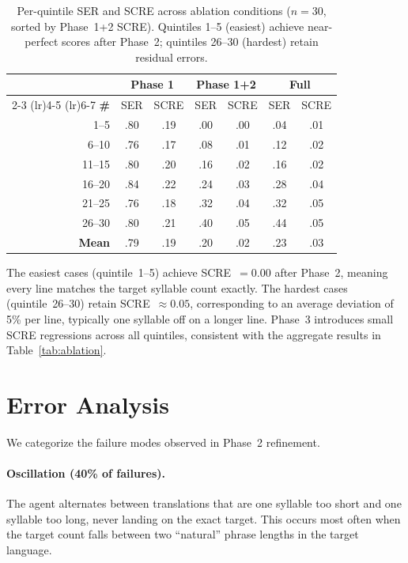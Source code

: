 \documentclass[11pt]{article}
\begin{document}
\begin{table}[h]
\centering
\small
\begin{tabular}{@{}rcccccc@{}}
\toprule
& \multicolumn{2}{c}{\textbf{Phase 1}} & \multicolumn{2}{c}{\textbf{Phase 1+2}} & \multicolumn{2}{c}{\textbf{Full}} \\
\cmidrule(lr){2-3} \cmidrule(lr){4-5} \cmidrule(lr){6-7}
\textbf{\#} & SER & SCRE & SER & SCRE & SER & SCRE \\
\midrule
1--5   & .80 & .19 & .00 & .00 & .04 & .01 \\
6--10  & .76 & .17 & .08 & .01 & .12 & .02 \\
11--15 & .80 & .20 & .16 & .02 & .16 & .02 \\
16--20 & .84 & .22 & .24 & .03 & .28 & .04 \\
21--25 & .76 & .18 & .32 & .04 & .32 & .05 \\
26--30 & .80 & .21 & .40 & .05 & .44 & .05 \\
\midrule
\textbf{Mean} & .79 & .19 & .20 & .02 & .23 & .03 \\
\bottomrule
\end{tabular}
\caption{Per-quintile SER and SCRE across ablation conditions ($n{=}30$, sorted by Phase~1+2 SCRE). Quintiles 1--5 (easiest) achieve near-perfect scores after Phase~2; quintiles 26--30 (hardest) retain residual errors.}
\label{tab:pertest}
\end{table}

The easiest cases (quintile~1--5) achieve SCRE~$= 0.00$ after Phase~2, meaning every line matches the target syllable count exactly.
The hardest cases (quintile~26--30) retain SCRE~$\approx 0.05$, corresponding to an average deviation of 5\% per line, typically one syllable off on a longer line.
Phase~3 introduces small SCRE regressions across all quintiles, consistent with the aggregate results in Table~\ref{tab:ablation}.

\section{Error Analysis}
\label{app:errors}

We categorize the failure modes observed in Phase~2 refinement.

\paragraph{Oscillation (40\% of failures).}
The agent alternates between translations that are one syllable too short and one syllable too long, never landing on the exact target.
This occurs most often when the target count falls between two ``natural'' phrase lengths in the target language.
\end{document}
